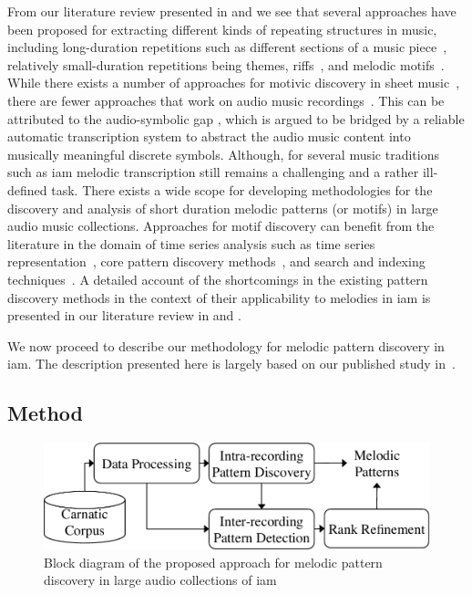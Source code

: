 From our literature review presented in  and  we see that several approaches have been proposed for extracting different kinds of repeating structures in music, including long-duration repetitions such as different sections of a music piece~\citep{serra2012unsupervised,Goto06TASLP, paulus2010state}, relatively small-duration repetitions being themes, riffs~\citep{Hsu2001a}, and melodic motifs~\citep{meredith2002algorithms,collins2011improved,Janssen2013}. While there exists a number of approaches for motivic discovery in sheet music~\cite{meredith2002algorithms,Cambouropoulos2006,conklin2001representation,Lartillot2005}, there are fewer approaches that work on audio music recordings~\cite{dannenberg2003pattern}. This can be attributed to the audio-symbolic gap \cite{collins2014bridging}, which is argued to be bridged by a reliable automatic transcription system to abstract the audio music content into musically meaningful discrete symbols. Although, for several music traditions such as \gls{iam} melodic transcription still remains a challenging and a rather ill-defined task.  There exists a wide scope for developing methodologies for the discovery and analysis of short duration melodic patterns (or motifs) in large audio music collections. Approaches for motif discovery can benefit from the literature in the domain of time series analysis such as time series representation~\cite{Lin2003}, core pattern discovery methods~\cite{Mueen2009}, and search and indexing techniques~\cite{Rakthanmanon2013}. A detailed account of the shortcomings in the existing pattern discovery methods in the context of their applicability to melodies in \gls{iam} is presented in our literature review in  and .

We now proceed to describe our methodology for melodic pattern discovery in \gls{iam}. The description presented here is largely based on our published study in~\cite{gulati_SITIS_2014}. 


\subsection{Method}
\label{sec:patterns_discovery_method}

\begin{figure}
	\begin{center}
		\includegraphics[width=\figSizeEightyFive]{ch06_patterns/figures/discovery/blockDiagram_Overall.pdf}
	\end{center}
	\caption{Block diagram of the proposed approach for melodic pattern discovery in large audio collections of \gls{iam}}
	\label{fig:pattern_discovery_overall_block_diagram}
\end{figure}

